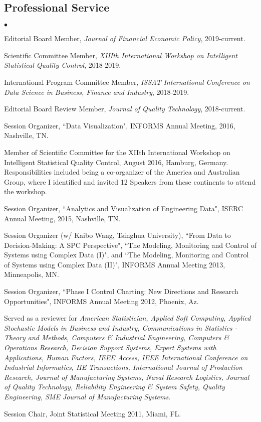 \documentclass[margin,line]{res}
\newenvironment{list2}{
  \begin{list}{$\bullet$}{%
      \setlength{\itemsep}{0in}
      \setlength{\parsep}{0in} \setlength{\parskip}{0in}
      \setlength{\topsep}{0in} \setlength{\partopsep}{0in} 
      \setlength{\leftmargin}{0.2in}}}{\end{list}}
\begin{document}
\begin{resume}
\section{\sc Professional Service}
\begin{list2}
	\item Editorial Board Member, \textit{Journal of Financial Economic Policy}, 2019-current.
	\item Scientific Committee Member, \textit{XIIIth International Workshop on Intelligent Statistical Quality Control}, 2018-2019.
	\item International Program Committee Member, \textit{ISSAT International Conference on Data Science in Business, Finance and Industry}, 2018-2019. 
	\item Editorial Board Review Member, \textit{Journal of Quality Technology}, 2018-current. 
	\item Session Organizer, ``Data Visualization", INFORMS Annual Meeting, 2016, Nashville, TN.
	\item Member of Scientific Committee for the XIIth International Workshop on Intelligent Statistical Quality Control, August 2016, Hamburg, Germany. Responsibilities included being a co-organizer of the America and Australian Group, where I identified and invited  12 Speakers from these continents to attend the workshop.
	\item Session Organizer, ``Analytics and Visualization of Engineering Data", ISERC Annual Meeting, 2015, Nashville, TN.
	\item Session Organizer (w/ Kaibo Wang, Tsinghua University), ``From Data to Decision-Making: A SPC Perspective", ``The Modeling, Monitoring and Control of Systems using Complex Data (I)", and ``The Modeling, Monitoring and Control of Systems using Complex Data (II)", INFORMS Annual Meeting 2013, Minneapolis, MN.
	\item Session Organizer, ``Phase I Control Charting: New Directions and Research Opportunities", INFORMS Annual Meeting 2012, Phoenix, Az.
	\item  Served as a reviewer for \textit{American Statistician, Applied Soft Computing, Applied Stochastic Models in Business and Industry,  Communications in Statistics - Theory and Methods, Computers \& Industrial Engineering, Computers \& Operations Research, Decision Support Systems, Expert Systems with Applications, Human Factors, IEEE Access, IEEE International Conference on Industrial Informatics, IIE Transactions,  International Journal of Production Research, Journal of Manufacturing Systems, Naval Research Logistics, Journal of Quality Technology, Reliability Engineering \& System Safety,  Quality Engineering, SME Journal of Manufacturing Systems}.
	\item Session Chair, Joint Statistical Meeting 2011, Miami, FL.
\end{list2}
 

\end{resume}
\end{document}
